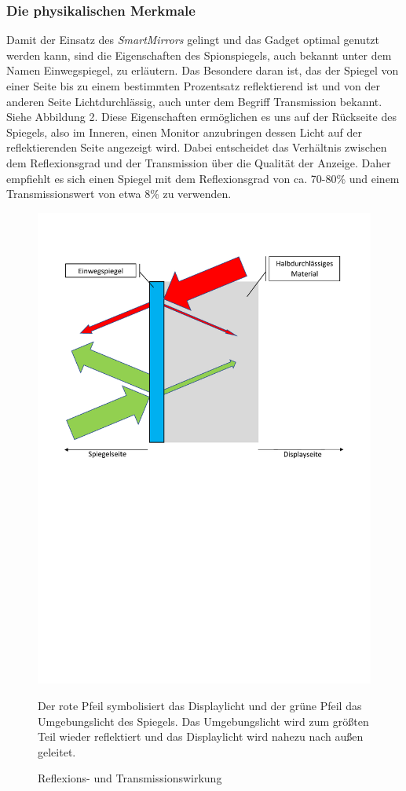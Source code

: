 \subsubsection{Die physikalischen Merkmale}
Damit der Einsatz des \textit{SmartMirrors} gelingt und das Gadget optimal genutzt werden kann, sind die Eigenschaften des Spionspiegels, auch bekannt unter dem Namen Einwegspiegel, zu erläutern. Das Besondere daran ist, das der Spiegel von einer Seite bis zu einem bestimmten Prozentsatz reflektierend ist und von der anderen Seite Lichtdurchlässig, auch unter dem Begriff Transmission bekannt. Siehe Abbildung 2. Diese Eigenschaften ermöglichen es uns auf der Rückseite des Spiegels, also im Inneren, einen Monitor anzubringen dessen Licht auf der reflektierenden Seite angezeigt wird. Dabei entscheidet das Verhältnis zwischen dem Reflexionsgrad und der Transmission über die Qualität der Anzeige. Daher empfiehlt es sich einen Spiegel mit dem Reflexionsgrad von ca. 70-80\% und einem Transmissionswert von etwa 8\% zu verwenden. 
\begin{figure}[H]
	\includegraphics[trim=30mm 140mm 30mm 30mm, scale=0.45]{bilder/Einwegspiegel.pdf}\\
	\caption{Reflexions- und Transmissionswirkung}
	{\scriptsize Der rote Pfeil symbolisiert das Displaylicht und der grüne Pfeil das Umgebungslicht des Spiegels. Das Umgebungslicht wird zum größten Teil wieder reflektiert und das Displaylicht wird nahezu nach außen geleitet. }
\end{figure}

